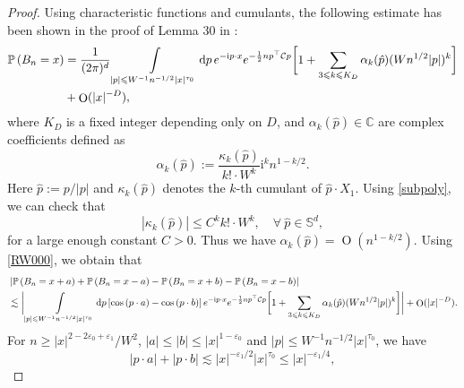 \documentclass{article}
\newcommand{\1}{\mathds{1}}
\numberwithin{equation}{section}
\newcommand{\rd}{{\rm d}}
\newcommand{\al}{\alpha}
\newcommand{\e}{{\varepsilon}}
\renewcommand{\cal}{\mathcal}
\newcommand{\ii}{\mathrm{i}} %
\renewcommand{\leq}{\leqslant}
\renewcommand{\geq}{\geqslant}
\renewcommand{\le}{\leq}
\renewcommand{\ge}{\geq}
\renewcommand{\P}{\mathbb{P}}
\newcommand{\R}{\mathbb{R}}
\newcommand{\C}{\mathbb{C}}
\DeclareMathOperator{\OO}{O}
\theoremstyle{plain} %
\theoremstyle{remark}
\begin{document}
\begin{proof}
Using characteristic functions and cumulants, the following estimate has been shown in the proof of Lemma 30 in \cite{PartIII}:
\begin{align} \label{RW000}
\P\left(B_n =x \right)& = \frac{1}{(2\pi)^d}\int\limits_{|p| \le W^{-1}n^{-1/2}|x|^{\tau_0}} \rd p \, e^{-\ii p\cdot x}e^{-\frac12 n p^\top\cal C p}\bigg[1+\sum_{3 \le k \le K_D}\al_k(\hat p)( Wn^{1/2} |p|)^k\bigg] \\
&+\OO(|x|^{-D}), \nonumber
\end{align}
where %
$K_D$ is a fixed integer depending only on $D$, and $\al_k(\hat p)\in \C$ are complex coefficients defined as 
$$ \al_k (\hat p):=\frac{\kappa_k(\hat p)}{k! \cdot W^k} \ii^k n^{1-k/2} .$$
Here $\hat p:= p/|p|$ and $\kappa_k(\hat p)$ denotes the $k$-th cumulant of $\hat p\cdot X_1$. Using \eqref{subpoly}, we can check that
$$ |\kappa_k(\hat p)|\le  C^k k! \cdot W^k, \quad  \forall \ \hat p \in \mathbb S^d ,$$
for a large enough constant $C>0$. Thus we have $\al_k(\hat p)=\OO(n^{1-k/2})$.  Using \eqref{RW000}, we obtain that 
\begin{align} 
&\left| \mathbb P\left(B_n = x + a\right) + \mathbb P\left(B_n = x - a \right) - \mathbb P\left(B_n = x + b\right)- \mathbb P\left(B_n = x - b\right) \right| \label{cumulantFourier2}\\
&\lesssim \bigg|\int\limits_{|p| \le W^{-1}n^{-1/2}|x|^{\tau_0}} \rd p \left[ \cos\left(p\cdot a\right)-\cos\left(p\cdot b\right)\right]  e^{-\ii p\cdot x}e^{-\frac12 n p^\top\cal C p}\bigg[1+\sum_{3 \le k \le K_D}\al_k(\hat p)( Wn^{1/2} |p|)^k\bigg]\bigg|+\OO(|x|^{-D}).\nonumber
\end{align}
For $n\ge {|x|^{2-2\e_0+\e_1}}/{W^2}$, $|a|\le |b| \le |x|^{1-\e_0}$ and $|p| \le W^{-1}n^{-1/2}|x|^{\tau_0}$, we have
 $$|p\cdot a|+ |p\cdot b|\lesssim |x|^{-\e_1/2} |x|^{\tau_0} \le |x|^{-\e_1/4},$$

\end{proof}
\end{document}
